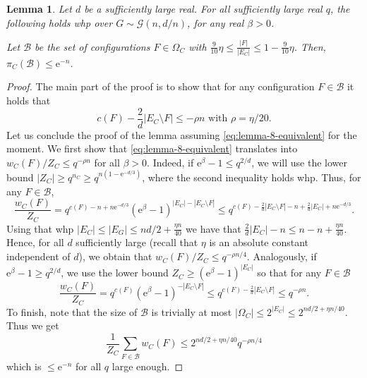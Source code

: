 \documentclass[11pt]{article}
\theoremstyle{plain}
\newtheorem{lemma}[theorem]{Lemma}
\newcommand{\G}{\mathcal{G}}
\newcommand{\emm}{\mathrm{e}}
\newcommand{\1}{\mathbb{1}}
\begin{document}
\begin{lemma}\label{lem:error-vanishes}
    Let $d$ be a sufficiently large real. For all sufficiently large real $q$, the following holds whp over \(G\sim\G(n,d/n)\), for any  real \(\beta > 0\).
    
    Let $\mathcal{B}$ be the set of configurations $F\in \Omega_C$ with $\tfrac{9}{10}\eta\leq \frac{|F|}{|E_C|}\leq 1-\tfrac{9}{10}\eta$.  Then, $\pi_C(\mathcal{B})\leq \emm^{-n}$.
\end{lemma}
\begin{proof}
    The main part of the proof is to show  that for any configuration \(F\in\mathcal{B}\) it holds that
    \begin{equation}\label{eq:lemma-8-equivalent}
        c(F) - \frac{2}{d}|E_C\setminus F| \leq - \rho n \mbox{ with } \rho=\eta/20.
    \end{equation}
    Let us conclude the proof of the lemma assuming \eqref{eq:lemma-8-equivalent} for the moment. We first show that \eqref{eq:lemma-8-equivalent} translates into $w_C(F)/Z_C\leq q^{-\rho n}$ for all $\beta>0$. Indeed, if \(\emm^\beta - 1 \leq q^{2/d}\), we will use the lower bound \(|Z_C|\geq q^{n_C}\geq q^{n(1-\emm^{-d/3})}\), where the second inequality holds whp. Thus, for any \(F\in\mathcal{B}\),
    \[
    \frac{w_C(F)}{Z_C} = q^{c(F) - n + n\emm^{-d/3}} (\emm^{\beta}-1)^{|E_C|-|E_C\setminus F|} \leq q^{c(F) - \frac{2}{d}|E_C\setminus F| - n + \frac{2}{d}|E_C| + n\emm^{-d/3}}.
    \]
    Using that whp \(|E_C|\leq |E_G| \leq nd / 2 + \frac{\eta n}{40}\) we have that \(\frac{2}{d}|E_C| - n \leq n - n + \frac{\eta n}{40}\). Hence, for all \(d\) sufficiently large (recall that $\eta$ is an absolute constant independent of $d$), we obtain that $w_C(F)/Z_C \leq q^{-\rho n/4}$. Analogously, if \(\emm^\beta - 1 \geq q^{2/d}\), we use the lower bound \(Z_C\geq (\emm^\beta-1)^{|E_C|}\) so that for any   \(F\in \mathcal{B}\) 
    \[
    \frac{w_C(F)}{Z_C} = q^{c(F)} (\emm^\beta-1)^{-|E_C \setminus F|} \leq q^{c(F) - \frac{2}{d} |E_C \setminus F|}\leq q^{-\rho n}.
    \]
    To finish, note that the size of $\mathcal{B}$   is trivially at most \(|\Omega_C|\leq 2^{|E_C|}\leq 2^{nd/2 + \eta n/40}\). Thus we get \[\frac{1}{Z_C}\sum_{F\in\mathcal{B}} w_C(F) \leq 2^{nd/2 + \eta n / 40}q^{-\rho n/4}\]
    which is \(\leq \emm^{-n}\) for all \(q\) large enough.



\end{proof}
\end{document}
